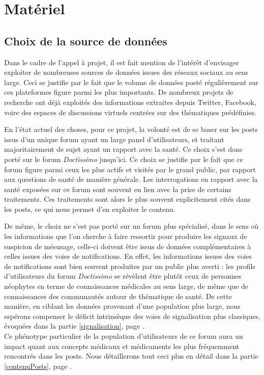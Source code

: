 \documentclass[a4paper, 12pt, openany, oneside, abstract=on]{article} %
\begin{document}
\section{Matériel}
\subsection{Choix de la source de données}
\label{ChoixDoctissimo}
Dans le cadre de l'appel à projet, il est fait mention de l'intérêt d'envisager exploiter de nombreuses sources de données issues des réseaux sociaux au sens large. Ceci se justifie par le fait que le volume de données posté régulièrement sur ces plateformes figure parmi les plus importants. De nombreux projets de recherche ont déjà exploités des informations extraites depuis Twitter, Facebook, voire des espaces de discussions virtuels centrées sur des thématiques prédéfinies\cite{Cameron2013,Bousquet2014,RavoireSophie2017}.

En l'état actuel des choses, pour ce projet, la volonté est de se baser sur les posts issus d'un unique forum ayant un large panel d'utilisateurs, et traitant majoritairement de sujet ayant un rapport avec la santé. Ce choix s'est donc porté sur le forum \emph{Doctissimo} jusqu'ici. Ce choix se justifie par le fait que ce forum figure parmi ceux les plus actifs et visités par le grand public, par rapport aux questions de santé de manière générale. 
Les interrogations en rapport avec la santé exposées sur ce forum sont souvent en lien avec la prise de certains traitements. Ces traitements sont alors le plus souvent explicitement cités dans les posts, ce qui nous permet d'en exploiter le contenu.

De même, le choix ne s'est pas porté sur un forum plus spécialisé, dans le sens où les informations que l'on cherche à faire ressortir pour produire les signaux de suspicion de mésusage, celle-ci doivent être issus de données complémentaires à celles issues des voies de notifications. En effet, les informations issues des voies de notifications sont bien souvent produites par un public plus averti : les profils d'utilisateurs du forum \emph{Doctissimo} se révèlent être plutôt ceux de personnes néophytes en terme de connaissances médicales au sens large, de même que de connaissances des communautés autour de thématique de santé. De cette manière, en ciblant les données provenant d'une population plus large, nous espérons compenser le déficit intrinsèque des voies de signalisation plus classiques, évoquées dans la partie \ref{signalisation}, page \pageref{signalisation}.\\
Ce phénotype particulier de la population d'utilisateurs de ce forum aura un impact quant aux concepts médicaux et médicaments les plus fréquemment rencontrés dans les posts. Nous détaillerons tout ceci plus en détail dans la partie \ref{contenuPosts}, page \pageref{contenuPosts}.
\end{document}
